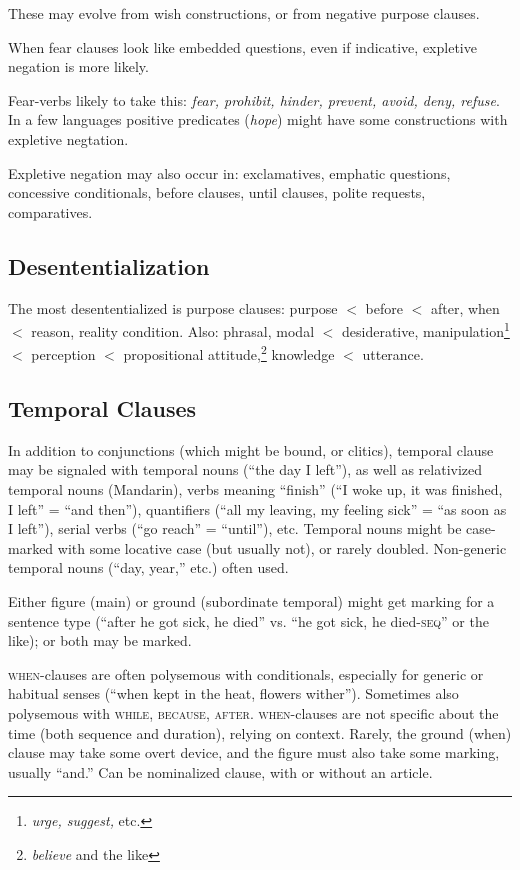 \documentclass[11pt]{article}
\newcommand{\E}[1]{\textit{#1}}   %
\newcommand{\I}[1]{\textsc{#1}}   %
\begin{document}
{These may evolve from wish constructions, or from negative
purpose clauses.

When fear clauses look like embedded questions, even if indicative,
expletive negation is more likely.

Fear-verbs likely to take this: \E{fear, prohibit, hinder, prevent,
  avoid, deny, refuse}.  In a few languages positive predicates
(\E{hope}) might have some constructions with expletive negtation.

Expletive negation may also occur in: exclamatives, emphatic
questions, concessive conditionals, before clauses, until clauses,
polite requests, comparatives.


\subsection{Desententialization}
The most desententialized is purpose clauses: purpose $<$ before $<$
after, when $<$ reason, reality condition.  Also: phrasal, modal $<$
desiderative, manipulation\footnote{\textit{urge, suggest,} etc.} $<$
perception $<$ propositional attitude,\footnote{\textit{believe} and
the like} knowledge $<$ utterance.


\subsection{Temporal Clauses}
In addition to conjunctions (which might be bound, or clitics),
temporal clause may be signaled with temporal nouns (``the day I
left''), as well as relativized temporal nouns (Mandarin), verbs
meaning ``finish'' (``I woke up, it was finished, I left'' = ``and
then''), quantifiers (``all my leaving, my feeling sick'' = ``as soon
as I left''), serial verbs (``go reach'' = ``until''), etc.  Temporal
nouns might be case-marked with some locative case (but usually not),
or rarely doubled.  Non-generic temporal nouns (``day, year,'' etc.)
often used.

Either figure (main) or ground (subordinate temporal) might get
marking for a sentence type (``after he got sick, he died'' vs. ``he
got sick, he died-\I{seq}'' or the like); or both may be marked.

\I{when}-clauses are often polysemous with conditionals, especially
for generic or habitual senses (``when kept in the heat, flowers
wither'').  Sometimes also polysemous with \I{while, because, after}.
\I{when}-clauses are not specific about the time (both sequence and
duration), relying on context.  Rarely, the ground (when) clause may
take some overt device, and the figure must also take some marking,
usually ``and.''  Can be nominalized clause, with or without an
article. 

}
\end{document}
